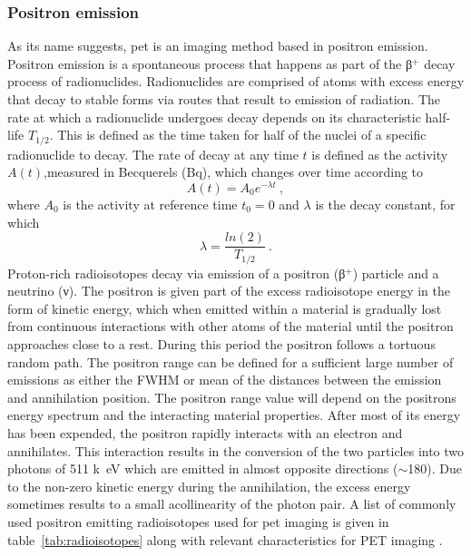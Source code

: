 \subsubsection{Positron emission}
As its name suggests, \gls{pet} is an imaging method based in positron emission. Positron emission is a spontaneous process that happens as part of the β$^{+}$ decay process of radionuclides. 
Radionuclides are comprised of atoms with excess energy that decay to stable forms via routes that result to emission of radiation.
The rate at which a radionuclide undergoes decay depends on its characteristic half-life $T_{1/2}$. This is defined as the time taken for half of the nuclei of a specific radionuclide to decay. The rate of decay at any time $t$ is defined as the activity $A(t)$,measured in Becquerels (Bq), which changes over time according to
\begin{equation} \label{Decay}
A(t) = A_0 e^{-\lambda t} \ ,
\end{equation}
where $A_0$ is the activity at reference time $t_0=0$ and $\lambda$ is the decay constant, for which 
\begin{equation} \label{Decayconstant}
\lambda = \frac{ln(2)}{T_{1/2}} \ .
\end{equation}
%
Proton-rich radioisotopes decay via emission of a positron (β$^{+}$) particle and a neutrino (ν). The positron is given part of the excess radioisotope energy in the form of kinetic energy, which when emitted within a material is gradually lost from continuous interactions with other atoms of the material until the positron approaches close to a rest. During this period the positron follows a tortuous random path. The positron range can be defined for a sufficient large number of emissions as either the FWHM or mean of the distances between the emission and annihilation position. The positron range value will depend on the positrons energy spectrum and the interacting material properties. After most of its energy has been expended, the positron rapidly interacts with an electron and annihilates. This interaction results in the conversion of the two particles into two photons of 511 \si{k\electronvolt} which are emitted in almost opposite directions ($\sim$180\degree). Due to the non-zero kinetic energy during the annihilation, the excess energy sometimes results to a small acollinearity of the photon pair.
%
A list of commonly used positron emitting radioisotopes used for \gls{pet} imaging is given in table~\ref{tab:radioisotopes} along with relevant characteristics for PET imaging \cite{Conti2016}.

